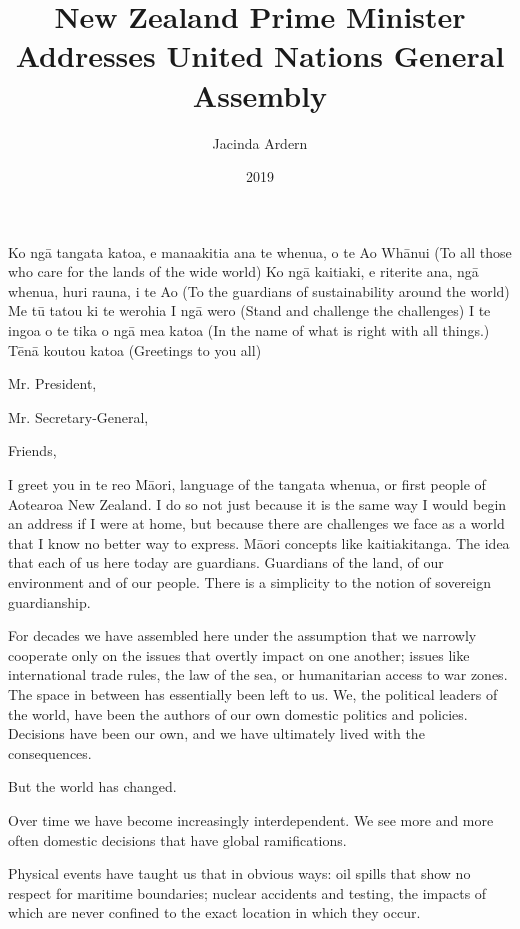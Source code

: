 \documentclass[10pt,a4paper]{article}
\begin{document}
\title{New Zealand Prime Minister Addresses United Nations General Assembly}
\date{2019}
\author{Jacinda Ardern}
\maketitle


\linenumbers
Ko ngā tangata katoa, e manaakitia ana te whenua, o te Ao Whānui
(To all those who care for the lands of the wide world)
Ko ngā kaitiaki, e riterite ana, ngā whenua, huri rauna, i te Ao
(To the guardians of sustainability around the world)
Me tū tatou ki te werohia I ngā wero
(Stand and challenge the challenges)
I te ingoa o te tika o ngā mea katoa
(In the name of what is right with all things.)
Tēnā koutou katoa
(Greetings to you all)

Mr. President,

Mr. Secretary-General,

Friends,

I greet you in te reo Māori, language of the tangata whenua, or first people of Aotearoa New Zealand. I do so not just because it is the same way I would begin an address if I were at home, but because there are challenges we face as a world that I know no better way to express. Māori concepts like kaitiakitanga. The idea that each of us here today are guardians. Guardians of the land, of our environment and of our people. There is a simplicity to the notion of sovereign guardianship.

For decades we have assembled here under the assumption that we narrowly cooperate only on the issues that overtly impact on one another; issues like international trade rules, the law of the sea, or humanitarian access to war zones. The space in between has essentially been left to us. We, the political leaders of the world, have been the authors of our own domestic politics and policies. Decisions have been our own, and we have ultimately lived with the consequences.

But the world has changed.

Over time we have become increasingly interdependent. We see more and more often domestic decisions that have global ramifications.

Physical events have taught us that in obvious ways: oil spills that show no respect for maritime boundaries; nuclear accidents and testing, the impacts of which are never confined to the exact location in which they occur.
\end{document}
